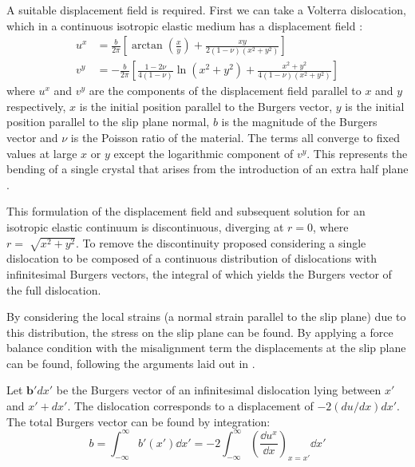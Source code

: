 A suitable displacement field is required. First we can take a Volterra dislocation, which in a continuous isotropic elastic medium has a displacement field \cite{Hirth1982Straight_dislocs}:
\begin{subequations}
\begin{align}
u^x &= \frac{b}{2\pi}\left[ \arctan\left(\frac{x}{y}\right) + \frac{xy}{2(1-\nu)(x^2 + y^2)} \right] \\[0.5ex]
v^y &= -\frac{b}{2\pi} \left[ \frac{1-2\nu}{4(1-\nu)} \ln(x^2 + y^2) + \frac{x^2 + y^2}{4(1-\nu)(x^2 + y^2)} \right]
\end{align}
\end{subequations}
where $u^x$ and $v^y$ are the components of the displacement field parallel to $x$ and $y$ respectively, $x$ is the initial position parallel to the Burgers vector, $y$ is the initial position parallel to the slip plane normal, $b$ is the magnitude of the Burgers vector and $\nu$ is the Poisson ratio of the material. The terms all converge to fixed values at large $x$ or $y$ except the logarithmic component of $v^y$. This represents the bending of a single crystal that arises from the introduction of an extra half plane \cite{Hirth1982Straight_dislocs}.

This formulation of the displacement field and subsequent solution for an isotropic elastic continuum is discontinuous, diverging at $r=0$, where $r=\sqrt[]{x^2+y^2}$. To remove the discontinuity \citet{Eshelby1949} proposed considering a single dislocation to be composed of a continuous distribution of dislocations with infinitesimal Burgers vectors, the integral of which yields the Burgers vector of the full dislocation. 

By considering the local strains (a normal strain parallel to the slip plane) due to this distribution, the stress on the slip plane can be found. By applying a force balance condition with the misalignment term the displacements at the slip plane can be found, following the arguments laid out in \cite{Hirth_Lothe1982lattice_periodicity}. 

Let $\mathbf{b}'dx'$ be the Burgers vector of an infinitesimal dislocation lying between $x'$ and $x'+dx'$. The dislocation corresponds to a displacement of $-2(du/dx)dx'$. The total Burgers vector can be found by integration:
\begin{equation}
b = \int_{-\infty}^{\infty} b'(x') \dd x' = -2\int^{\infty}_{-\infty} \left( \! \frac{\dd u^x}{\dd x} \right)_{x=x'} \dd x' 
\end{equation}

